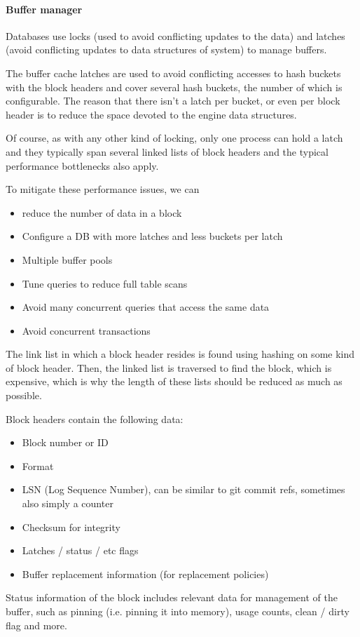 \paragraph{Buffer manager}
Databases use locks (used to avoid conflicting updates to the data) and latches (avoid conflicting updates to data structures of system) to manage buffers.

The buffer cache latches are used to avoid conflicting accesses to hash buckets with the block headers and cover several hash buckets, the number of which is configurable.
The reason that there isn't a latch per bucket, or even per block header is to reduce the space devoted to the engine data structures.

Of course, as with any other kind of locking, only one process can hold a latch and they typically span several linked lists of block headers
and the typical performance bottlenecks also apply.

To mitigate these performance issues, we can
\begin{itemize}
    \item reduce the number of data in a block
    \item Configure a DB with more latches and less buckets per latch
    \item Multiple buffer pools
    \item Tune queries to reduce full table scans
    \item Avoid many concurrent queries that access the same data
    \item Avoid concurrent transactions
\end{itemize}

The link list in which a block header resides is found using hashing on some kind of block header.
Then, the linked list is traversed to find the block, which is expensive, which is why the length of these lists should be reduced as much as possible.

Block headers contain the following data:
\begin{itemize}
    \item Block number or ID
    \item Format
    \item LSN (Log Sequence Number), can be similar to git commit refs, sometimes also simply a counter
    \item Checksum for integrity
    \item Latches / status / etc flags
    \item Buffer replacement information (for replacement policies)
\end{itemize}

Status information of the block includes relevant data for management of the buffer, such as pinning (i.e. pinning it into memory), usage counts, clean / dirty flag
and more.
